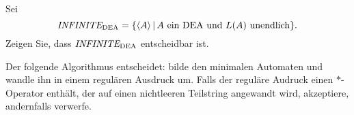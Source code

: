 Sei
\[
\text{\it INFINITE}_{\text{DEA}}
=
\{
\langle A\rangle\,|\,\text{$A$ ein DEA und $L(A)$ unendlich}
\}.
\]
Zeigen Sie, dass $\text{\it INFINITE}_{\text{DEA}}$
entscheidbar ist.


\begin{loesung}
Der folgende Algorithmus entscheidet: bilde den minimalen Automaten und
wandle ihn in einem regulären Ausdruck um. Falls der reguläre
Audruck einen $*$-Operator enthält, der auf einen nichtleeren
Teilstring angewandt wird, akzeptiere, andernfalls verwerfe.
\end{loesung}
